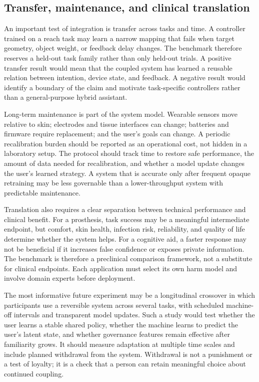 \documentclass[conference]{IEEEtran}
\begin{document}
\subsection{Transfer, maintenance, and clinical translation}

An important test of integration is transfer across tasks and time. A controller trained on a reach task may learn a narrow mapping that fails when target geometry, object weight, or feedback delay changes. The benchmark therefore reserves a held-out task family rather than only held-out trials. A positive transfer result would mean that the coupled system has learned a reusable relation between intention, device state, and feedback. A negative result would identify a boundary of the claim and motivate task-specific controllers rather than a general-purpose hybrid assistant.

Long-term maintenance is part of the system model. Wearable sensors move relative to skin; electrodes and tissue interfaces can change; batteries and firmware require replacement; and the user's goals can change. A periodic recalibration burden should be reported as an operational cost, not hidden in a laboratory setup. The protocol should track time to restore safe performance, the amount of data needed for recalibration, and whether a model update changes the user's learned strategy. A system that is accurate only after frequent opaque retraining may be less governable than a lower-throughput system with predictable maintenance.

Translation also requires a clear separation between technical performance and clinical benefit. For a prosthesis, task success may be a meaningful intermediate endpoint, but comfort, skin health, infection risk, reliability, and quality of life determine whether the system helps. For a cognitive aid, a faster response may not be beneficial if it increases false confidence or exposes private information. The benchmark is therefore a preclinical comparison framework, not a substitute for clinical endpoints. Each application must select its own harm model and involve domain experts before deployment.

The most informative future experiment may be a longitudinal crossover in which participants use a reversible system across several tasks, with scheduled machine-off intervals and transparent model updates. Such a study would test whether the user learns a stable shared policy, whether the machine learns to predict the user's latent state, and whether governance features remain effective after familiarity grows. It should measure adaptation at multiple time scales and include planned withdrawal from the system. Withdrawal is not a punishment or a test of loyalty; it is a check that a person can retain meaningful choice about continued coupling.
\end{document}
